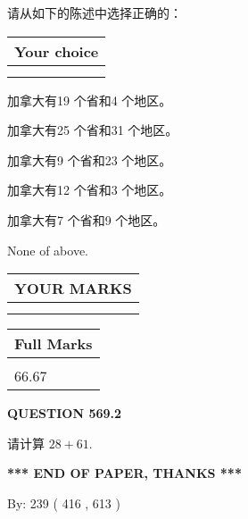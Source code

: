 \documentclass{ctexart}
\begin{document}
  
请从如下的陈述中选择正确的：
  
  
\noindent\hspace{3.0in} \begin{tabular}{|l|}
\hline
Your choice \\
\hline
 \\ 
 \\ 
\hline
\end{tabular}
  
  
 
 
加拿大有19 个省和4 个地区。
 
 
加拿大有25 个省和31 个地区。
 
 
加拿大有9 个省和23 个地区。
 
 
加拿大有12 个省和3 个地区。
 
 
加拿大有7 个省和9 个地区。
 
 
 None of above.
 
 
  
\vspace{0.2in}
  
\noindent\begin{tabular}{|l|}
\hline
 YOUR MARKS  \\
\hline
 \\ 
 \\ 
\hline
\end{tabular}
\hspace{0.05in} \begin{tabular}{|l|}
\hline
 Full Marks  \\
\hline
 \\ 
66.67 \\
\hline
\end{tabular}
{\textbf{\Large{QUESTION
569.2 
}}}
  
  
 
请计算 $ %
28 +  %
61 $.
 

 

 
   
   
 \vspace{0.2in}
 
   
   
   
   
\vspace{1.0in} 
{\textbf{\large{ *** END OF PAPER, THANKS *** }}} 
   
   
\hspace{1.0in} By: 
 239 ( 416 ,  613 )
   
\end{document}
